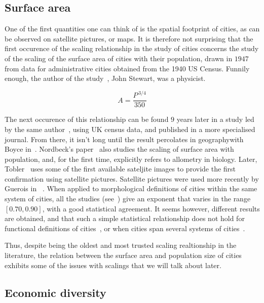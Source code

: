 \subsection{Surface area}
\label{sub:surface_area}

One of the first quantities one can think of is the spatial footprint of cities,
as can be observed on satellite pictures, or maps. It is therefore not
surprising that the first occurence of the scaling relationship in the study of
cities concerns the study of the scaling of the surface area of cities with
their population, drawn in $1947$ from data for administrative cities obtained
from the 1940 US Census.  Funnily enough, the author of the
study~\cite{Stewart:1947}, John Stewart, was a physicist.

\begin{equation}
    A = \frac{P^{\,3/4}}{350}
\end{equation}

The next occurence of this relationship can be found $9$ years later in a study
led by the same author~\cite{Stewart:1958}, using UK census data, and published
in a more specialised journal. From there, it isn't long until the result
percolates in geographywith Boyce in~\cite{Boyce:1963}.  Nordbeck's
paper~\cite{Nordbeck:1965} also studies the scaling of surface area with
population, and, for the first time, explicitly refers to allometry in biology.
Later, Tobler~\cite{Tobler:1969} uses some of the first available sateljite
images to provide the first confirmation using satellite pictures. Satellite
pictures were used more recently by Guerois in ~\cite{Guerois:2003}. When
applied to morphological definitions of cities within the same system of cities,
all the studies (see~\cite{Batty:2011}) give an exponent that varies in the
range $[0.70, 0.90]$, with a good statistical agreement. It seems however,
different results are obtained, and that such a simple statistical relationship
does not hold for functional definitions of cities~\cite{Batty:2011}, or when
cities span several systems of cities~\cite{Fuller:2009}.

Thus, despite being the oldest and most trusted scaling realtionship in the
literature, the relation between the surface area and population size of cities
exhibits some of the issues with scalings that we will talk about later.

\subsection{Economic diversity}
\label{sub:economic_diversity}

